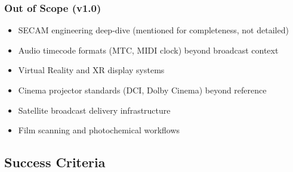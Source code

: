 \documentclass[11pt,letterpaper]{article}
\begin{document}
\subsubsection{Out of Scope (v1.0)}
\begin{itemize}[leftmargin=*]
  \item SECAM engineering deep-dive (mentioned for completeness, not detailed)
  \item Audio timecode formats (MTC, MIDI clock) beyond broadcast context
  \item Virtual Reality and XR display systems
  \item Cinema projector standards (DCI, Dolby Cinema) beyond reference
  \item Satellite broadcast delivery infrastructure
  \item Film scanning and photochemical workflows
\end{itemize}

\subsection{Success Criteria}
\end{document}
